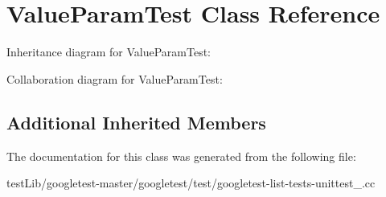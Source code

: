 \hypertarget{classValueParamTest}{}\section{Value\+Param\+Test Class Reference}
\label{classValueParamTest}


Inheritance diagram for Value\+Param\+Test\+:


Collaboration diagram for Value\+Param\+Test\+:
\subsection*{Additional Inherited Members}


The documentation for this class was generated from the following file\+:\begin{DoxyCompactItemize}
\item 
test\+Lib/googletest-\/master/googletest/test/googletest-\/list-\/tests-\/unittest\+\_\+.\+cc\end{DoxyCompactItemize}
